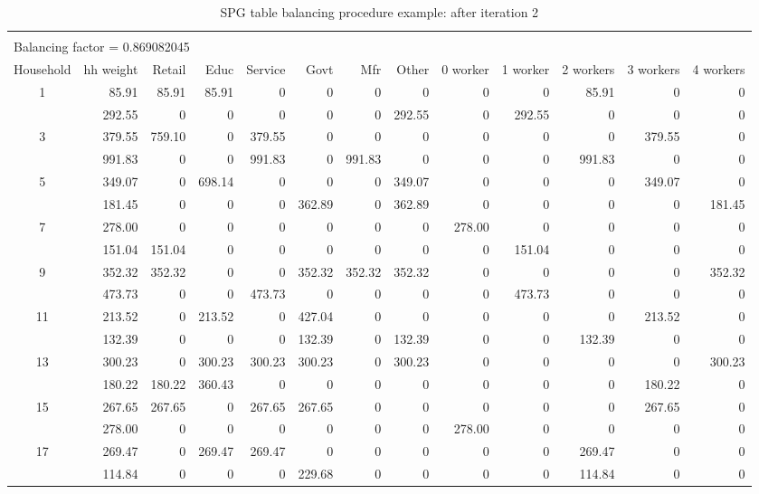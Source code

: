 \begin{sidewaystable}  %
\centering
\caption{SPG table balancing procedure example: after iteration 2}
\label{tab:spg-after-iteration2}
\small
\begin{tabular}{c*{12}{r}}
\vspace{-8pt} \\
\multicolumn{8}{l}{Balancing factor = 0.869082045} \\
\hline
Household & hh weight & Retail & Educ & Service & Govt & Mfr & Other & 0 worker & 1 worker & 2 workers & 3 workers & 4 workers \\
\hline
1 & 85.91 & 85.91 & 85.91 & 0 & 0 & 0 & 0 & 0 & 0 & 85.91 & 0 & 0 \\
\gray 2 & 292.55 & 0 & 0 & 0 & 0 & 0 & 292.55 & 0 & 292.55 & 0 & 0 & 0 \\
3 & 379.55 & 759.10 & 0 & 379.55 & 0 & 0 & 0 & 0 & 0 & 0 & 379.55 & 0 \\
\gray 4 & 991.83 & 0 & 0 & 991.83 & 0 & 991.83 & 0 & 0 & 0 & 991.83 & 0 & 0 \\
5 & 349.07 & 0 & 698.14 & 0 & 0 & 0 & 349.07 & 0 & 0 & 0 & 349.07 & 0 \\
\gray 6 & 181.45 & 0 & 0 & 0 & 362.89 & 0 & 362.89 & 0 & 0 & 0 & 0 & 181.45 \\
7 & 278.00 & 0 & 0 & 0 & 0 & 0 & 0 & 278.00 & 0 & 0 & 0 & 0 \\
\gray 8 & 151.04 & 151.04 & 0 & 0 & 0 & 0 & 0 & 0 & 151.04 & 0 & 0 & 0 \\
9 & 352.32 & 352.32 & 0 & 0 & 352.32 & 352.32 & 352.32 & 0 & 0 & 0 & 0 & 352.32 \\
\gray 10 & 473.73 & 0 & 0 & 473.73 & 0 & 0 & 0 & 0 & 473.73 & 0 & 0 & 0 \\
11 & 213.52 & 0 & 213.52 & 0 & 427.04 & 0 & 0 & 0 & 0 & 0 & 213.52 & 0 \\
\gray 12 & 132.39 & 0 & 0 & 0 & 132.39 & 0 & 132.39 & 0 & 0 & 132.39 & 0 & 0 \\
13 & 300.23 & 0 & 300.23 & 300.23 & 300.23 & 0 & 300.23 & 0 & 0 & 0 & 0 & 300.23 \\
\gray 14 & 180.22 & 180.22 & 360.43 & 0 & 0 & 0 & 0 & 0 & 0 & 0 & 180.22 & 0 \\
15 & 267.65 & 267.65 & 0 & 267.65 & 267.65 & 0 & 0 & 0 & 0 & 0 & 267.65 & 0 \\
\gray 16 & 278.00 & 0 & 0 & 0 & 0 & 0 & 0 & 278.00 & 0 & 0 & 0 & 0 \\
17 & 269.47 & 0 & 269.47 & 269.47 & 0 & 0 & 0 & 0 & 0 & 269.47 & 0 & 0 \\
\gray 18 & 114.84 & 0 & 0 & 0 & 229.68 & 0 & 0 & 0 & 0 & 114.84 & 0 & 0 \\

\end{tabular}
\end{sidewaystable}
